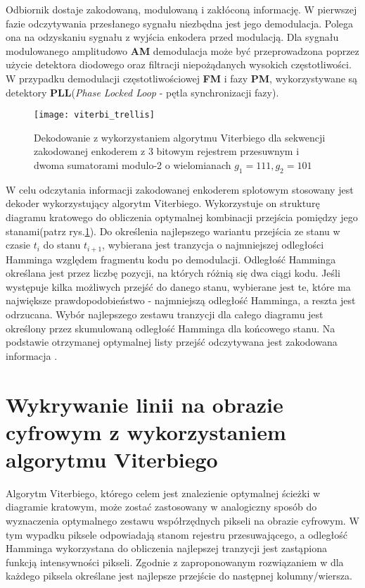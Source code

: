 \documentclass[document.tex]{subfiles}
\begin{document}
\indent Odbiornik dostaje zakodowaną, modulowaną i zakłóconą informację. W pierwszej fazie odczytywania przesłanego sygnału niezbędna jest jego demodulacja. Polega ona na odzyskaniu sygnału z wyjścia enkodera przed modulacją.
Dla sygnału modulowanego amplitudowo \textbf{AM} demodulacja może być przeprowadzona poprzez użycie detektora diodowego oraz filtracji niepożądanych wysokich częstotliwości.\cite{demodulation_am}
W przypadku demodulacji częstotliwościowej \textbf{FM} i fazy \textbf{PM}, wykorzystywane są detektory \textbf{PLL}(\textit{Phase Locked Loop} - pętla synchronizacji fazy)\cite{demodulation_fmpm}.

\begin{figure}[h]
\texttt{[image: viterbi\_trellis]}
\caption{Dekodowanie z wykorzystaniem algorytmu Viterbiego dla sekwencji zakodowanej enkoderem z 3 bitowym rejestrem przesuwnym i dwoma sumatorami modulo-2 o wielomianach $g_1 = 111, g_2 = 101$ \protect\cite{Comm_Sklar}}
\label{fig:viterbi_trellis}
\end{figure}

\indent W celu odczytania informacji zakodowanej enkoderem splotowym stosowany jest dekoder
wykorzystujący algorytm Viterbiego. Wykorzystuje on strukturę diagramu kratowego do obliczenia optymalnej
kombinacji przejścia pomiędzy jego stanami(patrz rys.\ref{fig:viterbi_trellis}). Do określenia najlepszego wariantu przejścia ze stanu w czasie $t_i$ do stanu $t_{i+1}$, wybierana jest tranzycja o najmniejszej odległości Hamminga\cite{Comm_Sklar} względem fragmentu kodu po demodulacji. Odległość Hamminga określana jest przez liczbę pozycji, na których różnią się dwa ciągi kodu.
Jeśli występuje kilka możliwych przejść do danego stanu, wybierane jest te, które ma największe prawdopodobieństwo - najmniejszą odległość Hamminga, a reszta jest odrzucana. Wybór najlepszego zestawu tranzycji
dla całego diagramu jest określony przez skumulowaną odległość Hamminga dla końcowego stanu. 
Na podstawie otrzymanej optymalnej listy przejść odczytywana jest zakodowana informacja .\cite{Comm_Sklar}\cite{viterbi_tutorial}\cite{viterbi_mit}
 
\section{Wykrywanie linii na obrazie cyfrowym z wykorzystaniem algorytmu Viterbiego}
\indent Algorytm Viterbiego, którego celem jest znalezienie optymalnej ścieżki w diagramie kratowym, może zostać zastosowany w analogiczny sposób do wyznaczenia optymalnego zestawu współrzędnych pikseli na obrazie cyfrowym.
W tym wypadku piksele odpowiadają stanom rejestru przesuwającego, a odległość Hamminga wykorzystana do obliczenia najlepszej tranzycji jest zastąpiona funkcją intensywności pikseli. Zgodnie z zaproponowanym rozwiązaniem w \cite{viterbi_ch_9} dla każdego piksela określane jest najlepsze przejście do następnej kolumny/wiersza.
\end{document}
